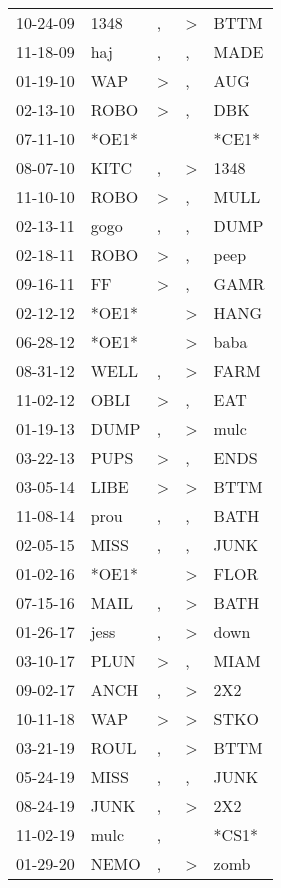 \begin{supertabular}{lllll}
 10-24-09 &   1348 &                , &     \textgreater &   BTTM \\
 11-18-09 &    haj &                , &                , &   MADE \\
 01-19-10 &    WAP &     \textgreater &                , &    AUG \\
 02-13-10 &   ROBO &     \textgreater &                , &    DBK \\
 07-11-10 &  *OE1* &                  &                  &  *CE1* \\
 08-07-10 &   KITC &                , &     \textgreater &   1348 \\
 11-10-10 &   ROBO &     \textgreater &                , &   MULL \\
 02-13-11 &   gogo &                , &                , &   DUMP \\
 02-18-11 &   ROBO &     \textgreater &                , &   peep \\
 09-16-11 &     FF &     \textgreater &                , &   GAMR \\
 02-12-12 &  *OE1* &                  &     \textgreater &   HANG \\
 06-28-12 &  *OE1* &                  &     \textgreater &   baba \\
 08-31-12 &   WELL &                , &     \textgreater &   FARM \\
 11-02-12 &   OBLI &     \textgreater &                , &    EAT \\
 01-19-13 &   DUMP &                , &     \textgreater &   mulc \\
 03-22-13 &   PUPS &     \textgreater &                , &   ENDS \\
 03-05-14 &   LIBE &     \textgreater &     \textgreater &   BTTM \\
 11-08-14 &   prou &                , &                , &   BATH \\
 02-05-15 &   MISS &                , &                , &   JUNK \\
 01-02-16 &  *OE1* &                  &     \textgreater &   FLOR \\
 07-15-16 &   MAIL &                , &     \textgreater &   BATH \\
 01-26-17 &   jess &                , &     \textgreater &   down \\
 03-10-17 &   PLUN &     \textgreater &                , &   MIAM \\
 09-02-17 &   ANCH &                , &     \textgreater &    2X2 \\
 10-11-18 &    WAP &     \textgreater &     \textgreater &   STKO \\
 03-21-19 &   ROUL &                , &     \textgreater &   BTTM \\
 05-24-19 &   MISS &                , &                , &   JUNK \\
 08-24-19 &   JUNK &                , &     \textgreater &    2X2 \\
 11-02-19 &   mulc &                , &                  &  *CS1* \\
 01-29-20 &   NEMO &                , &     \textgreater &   zomb \\
\end{supertabular}

